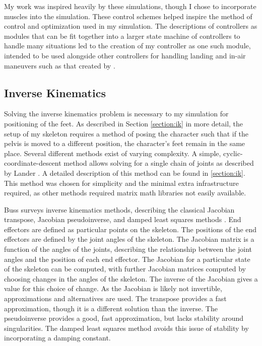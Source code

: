 My work was inspired heavily by these simulations, though I chose to incorporate muscles into the simulation.  These control schemes helped inspire the method of control and optimization used in my simulation.  The descriptions of controllers as modules that can be fit together into a larger state machine of controllers to handle many situations led to the creation of my controller as one such module, intended to be used alongside other controllers for handling landing and in-air maneuvers such as that created by \liufall{}.

\subsection{Inverse Kinematics}
\label{subsection:ik_bg}
Solving the inverse kinematics problem is necessary to my simulation for positioning of the feet.  As described in Section \ref{section:ik} in more detail, the setup of my skeleton requires a method of posing the character such that if the pelvis is moved to a different position, the character's feet remain in the same place.  Several different methods exist of varying complexity.  A simple, cyclic-coordinate-descent method allows solving for a single chain of joints as described by Lander \cite{kine1, kine2}. A detailed description of this method can be found in \ref{section:ik}.  This method was chosen for simplicity and the minimal extra infrastructure required, as other methods required matrix math libraries not easily available.

Buss surveys inverse kinematics methods, describing the classical Jacobian transpose, Jacobian pseudoinverse, and damped least squares methods \cite{buss_ik}.  End effectors are defined as particular points on the skeleton.  The positions of the end effectors are defined by the joint angles of the skeleton.  The Jacobian matrix is a function of the angles of the joints, describing the relationship between the joint angles and the position of each end effector.  The Jacobian for a particular state of the skeleton can be computed, with further Jacobian matrices computed by choosing changes in the angles of the skeleton.  The inverse of the Jacobian gives a value for this choice of change.  As the Jacobian is likely not invertible, approximations and alternatives are used.  The transpose provides a fast approximation, though it is a different solution than the inverse.  The pseudoinverse provides a good, fast approximation, but lacks stability around singularities.  The damped least squares method avoids this issue of stability by incorporating a damping constant.

